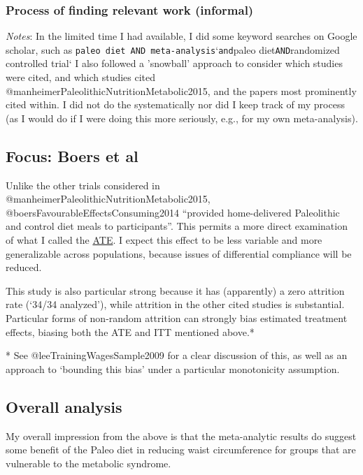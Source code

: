 \documentclass[]{article}
\begin{document}
\hypertarget{process-of-finding-relevant-work-informal}{%
\subsubsection{Process of finding relevant work
(informal)}\label{process-of-finding-relevant-work-informal}}

\emph{Notes}: In the limited time I had available, I did some keyword
searches on Google scholar, such as
\texttt{\textquotesingle{}paleo\ diet\textquotesingle{}\ AND\ \textquotesingle{}meta-analysis}`\texttt{and}paleo
diet\texttt{AND}randomized controlled trial` I also followed a
'snowball' approach to consider which studies were cited, and which
studies cited @manheimerPaleolithicNutritionMetabolic2015, and the
papers most prominently cited within. I did not do the systematically
nor did I keep track of my process (as I would do if I were doing this
more seriously, e.g., for my own meta-analysis).

\hypertarget{boers}{%
\subsection{Focus: Boers et al}\label{boers}}

Unlike the other trials considered in
@manheimerPaleolithicNutritionMetabolic2015,
@boersFavourableEffectsConsuming2014 ``provided home-delivered
Paleolithic and control diet meals to participants''. This permits a
more direct examination of what I called the
\protect\hyperlink{compliance}{ATE}. I expect this effect to be less
variable and more generalizable across populations, because issues of
differential compliance will be reduced.

This study is also particular strong because it has (apparently) a zero
attrition rate (`34/34 analyzed'), while attrition in the other cited
studies is substantial. Particular forms of non-random attrition can
strongly bias estimated treatment effects, biasing both the ATE and ITT
mentioned above.*

* See @leeTrainingWagesSample2009 for a clear discussion of this, as
well as an approach to `bounding this bias' under a particular
monotonicity assumption.

\hypertarget{overall-analysis}{%
\subsection{Overall analysis}\label{overall-analysis}}

My overall impression from the above is that the meta-analytic results
do suggest some benefit of the Paleo diet in reducing waist
circumference for groups that are vulnerable to the metabolic syndrome.
\end{document}
